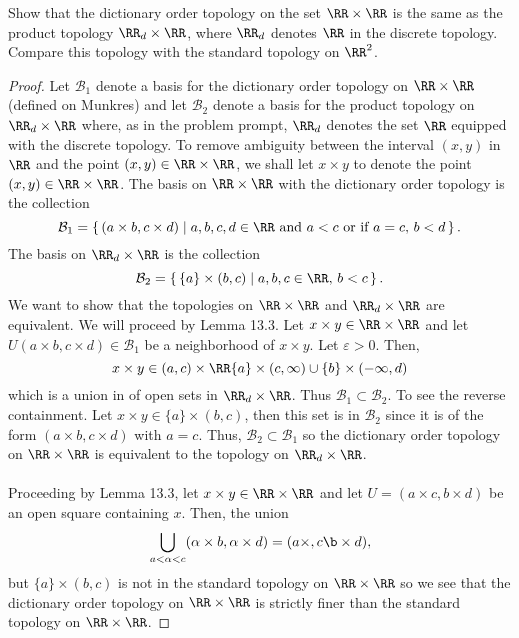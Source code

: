 \begin{problem}[Munkres, \S16, 9.]
Show that the dictionary order topology on the set $\RR\times\RR$
is the same as the product topology $\RR_d\times\RR$, where
$\RR_d$ denotes $\RR$ in the discrete topology. Compare this
topology with the standard topology on $\RR^2$.
\end{problem}
\begin{proof}
Let $\mathcal{B}_1$ denote a basis for the dictionary order
topology on $\RR\times\RR$ (defined on Munkres) and let
$\mathcal{B}_2$ denote a basis for the product topology on
$\RR_d\times\RR$ where, as in the problem prompt, $\RR_d$ denotes
the set $\RR$ equipped with the discrete topology. To remove
ambiguity between the interval $(x,y)$ in $\RR$ and the point
$(x,y)\in\RR\times\RR$, we shall let $x\times y$ to denote the
point $(x,y)\in\RR\times\RR$. The basis on $\RR\times\RR$ with
the dictionary order topology is the collection
\[
\mathcal{B}_1=\left\{\,(a\times b,c\times
  d)\;\middle|\;\text{$a,b,c,d\in\RR$ and $a<c$ or if $a=c$,
    $b<d$}\,\right\}.
\]
The basis on $\RR_d\times\RR$ is the collection
\[
\mathcal{B}_2=\left\{\,\{a\}\times
  (b,c)\;\middle|\;\text{$a,b,c\in\RR$, $b<c$}\,\right\}.
\]
We want to show that the topologies on $\RR\times\RR$ and
$\RR_d\times\RR$ are equivalent. We will proceed by Lemma
13.3. Let $x\times y\in\RR\times\RR$ and let $U(a\times b,c\times
d)\in\mathcal{B}_1$ be a neighborhood of $x\times y$. Let
$\varepsilon>0$. Then,
\[
x\times
y\in(a,c)\times\RR\{a\}\times(c,\infty)\cup\{b\}\times(-\infty,d)
\]
which is a union in of open sets in $\RR_d\times\RR$. Thus
$\mathcal{B}_1\subset\mathcal{B}_2$. To see the reverse
containment. Let $x\times y\in \{a\}\times (b,c)$, then this set
is in $\mathcal{B}_2$ since it is of the form $(a\times b,c\times
d)$ with $a=c$. Thus, $\mathcal{B}_2\subset\mathcal{B}_1$ so the
dictionary order topology on $\RR\times\RR$ is equivalent to the
topology on $\RR_d\times\RR$.
\\\\
Proceeding by Lemma 13.3, let $x\times y\in\RR\times\RR$ and let
$U=(a\times c,b\times d)$ be an open square containing $x$. Then,
the union
\[
\bigcup_{a<\alpha<c}(\alpha\times b,\alpha\times
d)=(a\times,c\b\times d),
\]
but $\{a\}\times(b,c)$ is not in the standard topology on
$\RR\times\RR$ so we see that the dictionary order topology on
$\RR\times\RR$ is strictly finer than the standard topology on
$\RR\times\RR$.
\end{proof}

